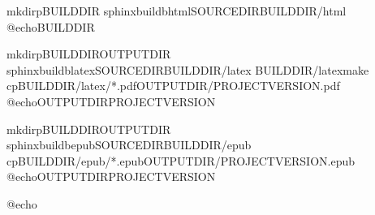\documentclass[letterpaper,10pt,english]{sphinxmanual}
\begin{document}
\begin{sphinxVerbatim}[commandchars=\\\{\}]
mkdir\PYGZhy{}pBUILDDIR
sphinx\PYGZhy{}build\PYGZhy{}bhtmlSOURCEDIRBUILDDIR/html
@echoBUILDDIR

mkdir\PYGZhy{}pBUILDDIROUTPUTDIR
sphinx\PYGZhy{}build\PYGZhy{}blatexSOURCEDIRBUILDDIR/latex
BUILDDIR/latexmake
cpBUILDDIR/latex/*.pdfOUTPUTDIR/PROJECT\PYGZhy{}VERSION.pdf
@echoOUTPUTDIRPROJECTVERSION

mkdir\PYGZhy{}pBUILDDIROUTPUTDIR
sphinx\PYGZhy{}build\PYGZhy{}bepubSOURCEDIRBUILDDIR/epub
cpBUILDDIR/epub/*.epubOUTPUTDIR/PROJECT\PYGZhy{}VERSION.epub
@echoOUTPUTDIRPROJECTVERSION

  
@echo


\end{sphinxVerbatim}
\end{document}
